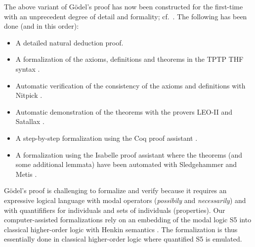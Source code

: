 \documentclass{llncs}
\begin{document}
%


The above variant of G\"{o}del's proof has now been 
constructed for the first-time
with an unprecedent degree of detail and formality; cf.~\cite{FormalTheologyRepository}. The following has been done (and in this order):
\begin{itemize}
\item A detailed natural deduction proof.
%
\item A formalization of the axioms, definitions and theorems in the TPTP THF syntax \cite{J22}.
%
\item Automatic verification of the consistency of the axioms and 
definitions with Nitpick \cite{Nitpick}.
%
\item Automatic demonstration of the theorems with the provers LEO-II \cite{LEO-II} and Satallax \cite{Satallax}.

\item A step-by-step formalization using the Coq proof assistant \cite{Coq}.

\item A formalization using the Isabelle proof assistant \cite{Isabelle} where the theorems (and some additional lemmata) have been automated with Sledgehammer \cite{Sledgehammer} and Metis \cite{Hurd03first-orderproof}.
\end{itemize}

G\"{o}del's proof is challenging to formalize and verify because it
requires an expressive logical language with modal operators
(\emph{possibily} and \emph{necessarily}) and with
quantififiers for individuals and sets of individuals (properties).  Our computer-assisted formalizations rely on an
embedding of the modal logic S5 into classical higher-order logic with
Henkin semantics \cite{J23,B9}. The formalization is thus essentially
done in classical higher-order logic where quantified S5 is emulated.
\end{document}
